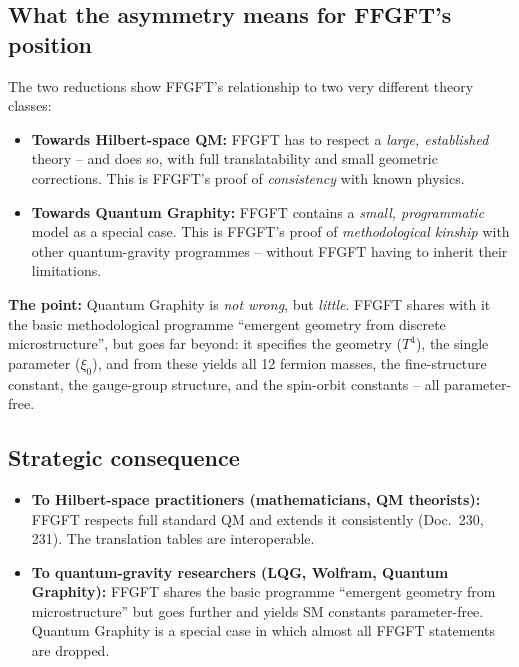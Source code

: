 \subsection{What the asymmetry means for FFGFT's position}

The two reductions show FFGFT's relationship to two very different
theory classes:

\begin{itemize}[leftmargin=2em,itemsep=2pt,topsep=2pt]
  \item \textbf{Towards Hilbert-space QM:} FFGFT has to respect a
        \emph{large, established} theory -- and does so, with full
        translatability and small geometric corrections. This is
        FFGFT's proof of \emph{consistency} with known physics.

  \item \textbf{Towards Quantum Graphity:} FFGFT contains a
        \emph{small, programmatic} model as a special case. This is
        FFGFT's proof of \emph{methodological kinship} with other
        quantum-gravity programmes -- without FFGFT having to inherit
        their limitations.
\end{itemize}

\textbf{The point:} Quantum Graphity is \emph{not wrong}, but
\emph{little}. FFGFT shares with it the basic methodological
programme \enquote{emergent geometry from discrete microstructure},
but goes far beyond: it specifies the geometry ($T^4$), the single
parameter ($\xi_0$), and from these yields all 12 fermion masses,
the fine-structure constant, the gauge-group structure, and the
spin-orbit constants -- all parameter-free.

\subsection{Strategic consequence}

\begin{itemize}[leftmargin=2em,itemsep=2pt,topsep=2pt]
  \item \textbf{To Hilbert-space practitioners (mathematicians,
        QM theorists):} FFGFT respects full standard QM and extends
        it consistently (Doc.~230, 231). The translation tables are
        interoperable.

  \item \textbf{To quantum-gravity researchers (LQG, Wolfram,
        Quantum Graphity):} FFGFT shares the basic programme
        \enquote{emergent geometry from microstructure} but goes
        further and yields SM constants parameter-free. Quantum
        Graphity is a special case in which almost all FFGFT
        statements are dropped.
\end{itemize}


